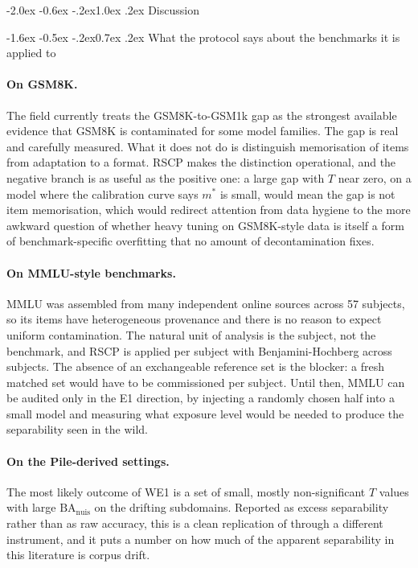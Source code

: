\documentclass[10pt,twocolumn,letterpaper]{article}
\makeatletter
\renewcommand\section{\@startsection{section}{1}{\z@}%
  {-2.0ex \@plus -0.6ex \@minus -.2ex}{1.0ex \@plus .2ex}%
  {\normalfont\large\bfseries}}
\renewcommand\subsection{\@startsection{subsection}{2}{\z@}%
  {-1.6ex \@plus -0.5ex \@minus -.2ex}{0.7ex \@plus .2ex}%
  {\normalfont\normalsize\bfseries}}
\newcommand{\BA}{\mathrm{BA}}
\newcommand{\nuis}{\mathrm{nuis}}
\makeatother
\begin{document}
\section{Discussion}
\label{sec:discussion}

\subsection{What the protocol says about the benchmarks it is applied to}

\paragraph{On GSM8K.} The field currently treats the GSM8K-to-GSM1k gap as the strongest available evidence that GSM8K is contaminated for some model families. The gap is real and carefully measured. What it does not do is distinguish memorisation of items from adaptation to a format. RSCP makes the distinction operational, and the negative branch is as useful as the positive one: a large gap with $T$ near zero, on a model where the calibration curve says $m^{*}$ is small, would mean the gap is not item memorisation, which would redirect attention from data hygiene to the more awkward question of whether heavy tuning on GSM8K-style data is itself a form of benchmark-specific overfitting that no amount of decontamination fixes.

\paragraph{On MMLU-style benchmarks.} MMLU \cite{hendrycks2021mmlu} was assembled from many independent online sources across 57 subjects, so its items have heterogeneous provenance and there is no reason to expect uniform contamination. The natural unit of analysis is the subject, not the benchmark, and RSCP is applied per subject with Benjamini-Hochberg across subjects. The absence of an exchangeable reference set is the blocker: a fresh matched set would have to be commissioned per subject. Until then, MMLU can be audited only in the E1 direction, by injecting a randomly chosen half into a small model and measuring what exposure level would be needed to produce the separability seen in the wild.

\paragraph{On the Pile-derived settings.} The most likely outcome of WE1 is a set of small, mostly non-significant $T$ values with large $\BA_{\nuis}$ on the drifting subdomains. Reported as excess separability rather than as raw accuracy, this is a clean replication of \citet{duan2024mia} through a different instrument, and it puts a number on how much of the apparent separability in this literature is corpus drift.
\end{document}
